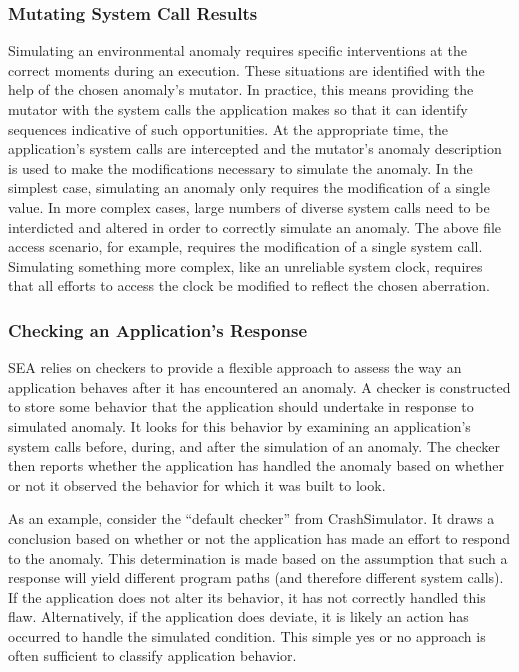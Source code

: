 \subsubsection{Mutating System Call Results}
\label{SUBSUB:MutatingCommunications}
Simulating an environmental anomaly requires specific interventions at the
correct moments during an execution.
These situations are identified
with the help of the chosen anomaly's
mutator.
In practice,
this means providing the
mutator with the system calls
the application makes
so that it can identify sequences
indicative of such opportunities.
At the appropriate time,
the application's system calls
are intercepted
and the mutator's anomaly description is used to
make the modifications necessary
to simulate the anomaly.
In the simplest case,
simulating an anomaly only requires
the modification of a single value.
In more complex cases,
large numbers of diverse system calls
need to be interdicted and altered
in order to correctly simulate an anomaly.
The above file access scenario, for example,
requires the modification of a single system call.
Simulating something more complex,
like an unreliable system clock,
requires that all efforts
to access the clock
be modified to reflect the chosen aberration.

\subsubsection{Checking an Application's Response}
\label{SUBSUB:CheckingResponse}
SEA relies on checkers
to provide a flexible approach to assess the way an application
behaves after it has encountered an anomaly.
A checker is constructed to store
some behavior that the application should undertake
in response to simulated anomaly.
It looks for this behavior by examining an application's system calls
before, during, and after the simulation of an anomaly.
The checker then reports whether the application has handled
the anomaly based on whether or not it observed the behavior for which it
was built to look.

As an example, consider the ``default checker'' from CrashSimulator.
It draws a conclusion based on
whether or not the application
has made an effort to respond
to the anomaly.
This determination is made based
on the assumption
that such a response will yield
different program paths (and therefore different system calls).
If the application
does not alter its behavior, it has not
correctly handled this flaw.
Alternatively,
if the application does deviate,
it is likely
an action has occurred to handle the simulated condition.
This simple yes or no approach
is often sufficient
to classify application behavior.



